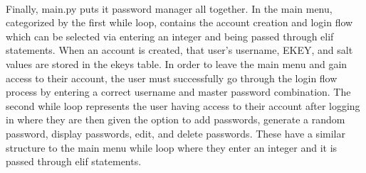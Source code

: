 \documentclass[10pt,twocolumn]{article}
\begin{document}
\paragraph{}
Finally, main.py puts it password manager all together. In the main menu, categorized by the first while loop, contains the account creation and login flow which can be selected via entering an integer and being passed through elif statements. When an account is created, that user's username, EKEY, and salt values are stored in the ekeys table. In order to leave the main menu and gain access to their account, the user must successfully go through the login flow process by entering a correct username and master password combination. The second while loop represents the user having access to their account after logging in where they are then given the option to add passwords, generate a random password, display passwords, edit, and delete passwords. These have a similar structure to the main menu while loop where they enter an integer and it is passed through elif statements. 


\printbibliography
\end{document}
